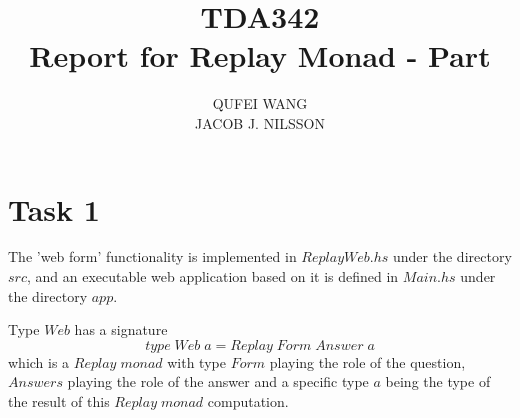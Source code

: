 \documentclass[10pt]{article}
\title{TDA342\\ Report for Replay Monad - Part \RomanNumeralCaps 2}
\author{QUFEI WANG \\ JACOB J. NILSSON}
\begin{document}
\maketitle
\section*{Task 1}
The 'web form' functionality is implemented in $ReplayWeb.hs$ under the directory $src$, and an executable web application based on it is defined in $Main.hs$ under the directory $app$.

Type $Web$ has a signature
$$type\; Web\; a = Replay\; Form\; Answer\; a$$
which is a $Replay\; monad$ with type $Form$ playing the role of the question, $Answers$ playing the role of the answer and a specific type $a$ being the type of the result of this $Replay\; monad$ computation.
\end{document}
